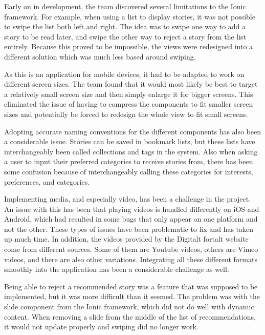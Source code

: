 Early on in development, the team discovered several limitations to the Ionic framework. For example, when using a list to display stories, it was not possible to swipe the list both left and right. The idea was to swipe one way to add a story to be read later, and swipe the other way to reject a story from the list entirely.  Because this proved to be impossible, the views were redesigned into a different solution which was much less based around swiping.\newline

As this is an application for mobile devices, it had to be adapted to work on different screen sizes. The team found that it would most likely be best to target a relatively small screen size and then simply enlarge it for bigger screens. This eliminated the issue of having to compress the components to fit smaller screen sizes and potentially be forced to redesign the whole view to fit small screens.\newline


Adopting accurate naming conventions for the different components has also been a considerable issue. Stories can be saved in bookmark lists, but these lists have interchangeably been called collections and tags in the system. Also when asking a user to input their preferred categories to receive stories from, there has been some confusion because of interchangeably calling these categories for interests,  preferences, and categories.\newline

Implementing media, and especially video, has been a challenge in the project. An issue with this has been that playing videos is handled differently on iOS and Android, which had resulted in some bugs that only appear on one platform and not the other. These types of issues have been problematic to fix and has taken up much time. In addition, the videos provided by the Digitalt fortalt website come from different sources. Some of them are Youtube videos, others are Vimeo videos, and there are also other variations. Integrating all these different formats smoothly into the application has been a considerable challenge as well. \newline

Being able to reject a recommended story was a feature that was supposed to be implemented, but it was more difficult than it seemed. The problem was with the slide component from the Ionic framework, which did not do well with dynamic content. When removing a slide from the middle of the list of recommendations, it would not update properly and swiping did no longer work. \newline

